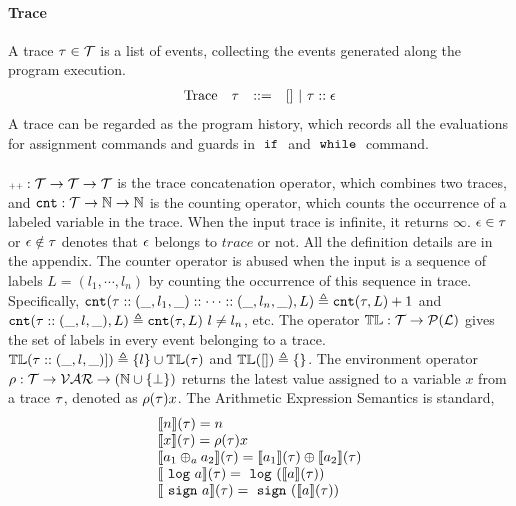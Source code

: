 \paragraph*{Trace}
A trace ${\mathtt{\tau}} \in \mathcal{T} $ is a list of events, 
collecting the events generated along the program execution. 
\[
\begin{array}{llll}
\mbox{Trace} & {\mathtt{\tau}}
& ::= & [] ~|~ {\mathtt{\tau}} :: {\mathtt{\epsilon}}
\end{array}
\]
A trace can be regarded as the program history, 
which records all the evaluations for assignment commands and guards in $\;{\mathtt{if}}\;$ and $\;{\mathtt{while}}\;$ command.
\\
\\
${\scriptscriptstyle ++}: \mathcal{T} \to \mathcal{T} \to \mathcal{T}$ is the trace concatenation operator, which combines two traces,
and ${\mathtt{cnt}} : \mathcal{T} \to \mathbb{N} \to \mathbb{N}$ is the counting operator, 
which counts the occurrence of a labeled variable in the trace. When the input trace is infinite, it returns $\infty$.
${\mathtt{\epsilon}} \in {\mathtt{\tau}} $ or ${\mathtt{\epsilon}} \notin {\mathtt{\tau}} $ denotes that ${\mathtt{\epsilon}}$ belongs to $trace$ or not.
All the definition details are in the appendix.
%
The counter operator is abused when the input is a sequence of labels $L = (l_1, \cdots, l_n)$ by counting the occurrence
of this sequence in trace. Specifically,
${\mathtt{cnt}}({\mathtt{\tau}} :: (\_, l_1, \_) :: \cdots :: (\_, l_n, \_), L ) \triangleq {\mathtt{cnt}}({\mathtt{\tau}}, L) + 1$
and ${\mathtt{cnt}}({\mathtt{\tau}} :: (\_, l, \_), L ) 
\triangleq {\mathtt{cnt}}({\mathtt{\tau}}, L) ~ l \neq l_n$, etc.
The operator $\mathbb{TL} : \mathcal{T} \to \mathcal{P}{(\mathcal{L})}$ gives the set of labels in every event belonging to a trace.
$\mathbb{TL}{({\mathtt{\tau}}  :: (\_, l, \_)])} \triangleq \{l\} \cup \mathbb{TL}{({\mathtt{\tau}} )}$ and $\mathbb{TL}({[ ]}) \triangleq \{\}$.
%
The environment operator $ \rho : {\mathcal{T}}  \to \mathcal{VAR} \to( \mathbb{N} \cup \{\bot\})$
returns the latest value assigned to a variable $x$ from a trace ${\mathtt{\tau}}$, denoted as $\rho({\mathtt{\tau}}) x$.
The Arithmetic Expression Semantics is standard, 
\[
\begin{array}{l}
\llbracket n \rrbracket ({\mathtt{\tau}}) = n \\
\llbracket x \rrbracket ({\mathtt{\tau}}) = \rho({\mathtt{\tau}}) x \\
\llbracket a_1 \oplus_a a_2 \rrbracket ({\mathtt{\tau}}) = \llbracket a_1 \rrbracket({\mathtt{\tau}}) \oplus \llbracket a_2 \rrbracket({\mathtt{\tau}}) \\
\llbracket ~{\mathtt{log}}~ a \rrbracket({\mathtt{\tau}}) = ~{\mathtt{log}}~ (\llbracket a \rrbracket({\mathtt{\tau}}))\\
\llbracket ~{\mathtt{sign}}~ a \rrbracket ({\mathtt{\tau}}) = ~{\mathtt{sign}}~ (\llbracket a \rrbracket({\mathtt{\tau}}))
\end{array}
\]
